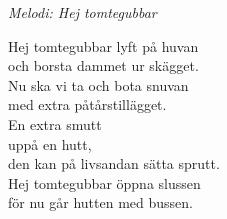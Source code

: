 {\footnotesize\textit{Melodi: Hej tomtegubbar}}\par
\vspace{10pt}
Hej tomtegubbar lyft på huvan\\
och borsta dammet ur skägget.\\
Nu ska vi ta och bota snuvan\\
med extra påtårstillägget.\\
En extra smutt\\
uppå en hutt,\\
den kan på livsandan sätta sprutt.\\
Hej tomtegubbar öppna slussen\\
för nu går hutten med bussen.
